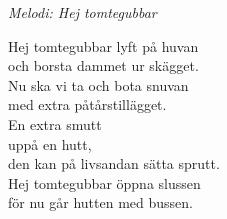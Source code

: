 {\footnotesize\textit{Melodi: Hej tomtegubbar}}\par
\vspace{10pt}
Hej tomtegubbar lyft på huvan\\
och borsta dammet ur skägget.\\
Nu ska vi ta och bota snuvan\\
med extra påtårstillägget.\\
En extra smutt\\
uppå en hutt,\\
den kan på livsandan sätta sprutt.\\
Hej tomtegubbar öppna slussen\\
för nu går hutten med bussen.
